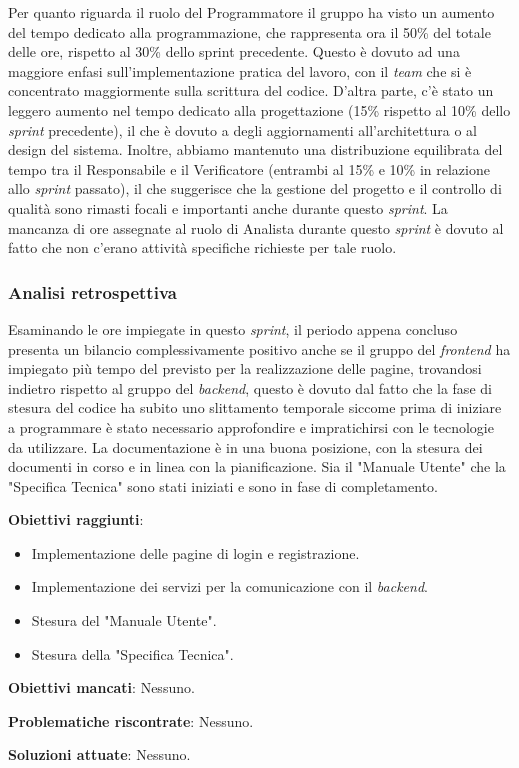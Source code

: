Per quanto riguarda il ruolo del Programmatore il gruppo ha visto un aumento del tempo dedicato alla programmazione, che rappresenta ora il 50\% del totale delle ore, 
rispetto al 30\% dello sprint precedente. Questo è dovuto ad una maggiore enfasi sull'implementazione pratica del lavoro, con il \textit{team} che si è concentrato maggiormente sulla scrittura del codice.
D'altra parte, c'è stato un leggero aumento nel tempo dedicato alla progettazione (15\% rispetto al 10\% dello \textit{sprint} precedente), il che 
è dovuto a degli aggiornamenti all'architettura o al design del sistema. Inoltre, abbiamo mantenuto una distribuzione equilibrata del tempo tra il Responsabile e il Verificatore
(entrambi al 15\% e 10\% in relazione allo \textit{sprint} passato), il che suggerisce che la gestione del progetto e il controllo di qualità sono rimasti focali e importanti anche durante questo \textit{sprint}.
La mancanza di ore assegnate al ruolo di Analista durante questo \textit{sprint} è dovuto al fatto che non c'erano attività specifiche richieste per tale ruolo.

\subsubsection{Analisi retrospettiva}
Esaminando le ore impiegate in questo \textit{sprint}, il periodo appena concluso presenta un bilancio complessivamente positivo anche se il gruppo del \textit{frontend} 
ha impiegato più tempo del previsto per la realizzazione delle pagine, trovandosi indietro rispetto al gruppo del \textit{backend}, questo è dovuto dal fatto che
la fase di stesura del codice ha subito uno slittamento temporale siccome prima di iniziare a programmare è stato necessario approfondire e impratichirsi con le tecnologie da utilizzare.
La documentazione è in una buona posizione, con la stesura dei documenti in corso e in linea con la pianificazione. Sia il "Manuale Utente" che la "Specifica Tecnica" 
sono stati iniziati e sono in fase di completamento.

\textbf{Obiettivi raggiunti}:
\begin{itemize}
	\item Implementazione delle pagine di login e registrazione.
	\item Implementazione dei servizi per la comunicazione con il \textit{backend}.
	\item Stesura del "Manuale Utente".
	\item Stesura della "Specifica Tecnica".
\end{itemize}

\textbf{Obiettivi mancati}: Nessuno.

\textbf{Problematiche riscontrate}: Nessuno.

\textbf{Soluzioni attuate}: Nessuno.